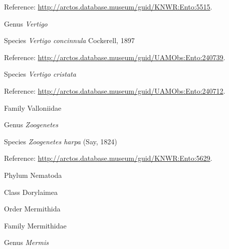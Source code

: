 \documentclass[9pt, article]{memoir}
\begin{document}
\begin{multicols}{2}
\vspace{6pt}Reference: 
\url{http://arctos.database.museum/guid/KNWR:Ento:5515}.

\vspace{6pt}\noindent\hspace{30pt}Genus \textit{Vertigo}


\vspace{6pt}\noindent\hspace{36pt}Species \textit{Vertigo concinnula} Cockerell, 1897


\vspace{6pt}Reference: 
\url{http://arctos.database.museum/guid/UAMObs:Ento:240739}.

\vspace{6pt}\noindent\hspace{36pt}Species \textit{Vertigo cristata}


\vspace{6pt}Reference: 
\url{http://arctos.database.museum/guid/UAMObs:Ento:240712}.

\vspace{6pt}\noindent\hspace{24pt}Family Valloniidae


\vspace{6pt}\noindent\hspace{30pt}Genus \textit{Zoogenetes}


\vspace{6pt}\noindent\hspace{36pt}Species \textit{Zoogenetes harpa} (Say, 1824)


\vspace{6pt}Reference: 
\url{http://arctos.database.museum/guid/KNWR:Ento:5629}.

\vspace{6pt}\noindent\hspace{6pt}Phylum Nematoda


\vspace{6pt}\noindent\hspace{12pt}Class Dorylaimea


\vspace{6pt}\noindent\hspace{18pt}Order Mermithida


\vspace{6pt}\noindent\hspace{24pt}Family Mermithidae


\vspace{6pt}\noindent\hspace{30pt}Genus \textit{Mermis}



\end{multicols}
\end{document}
